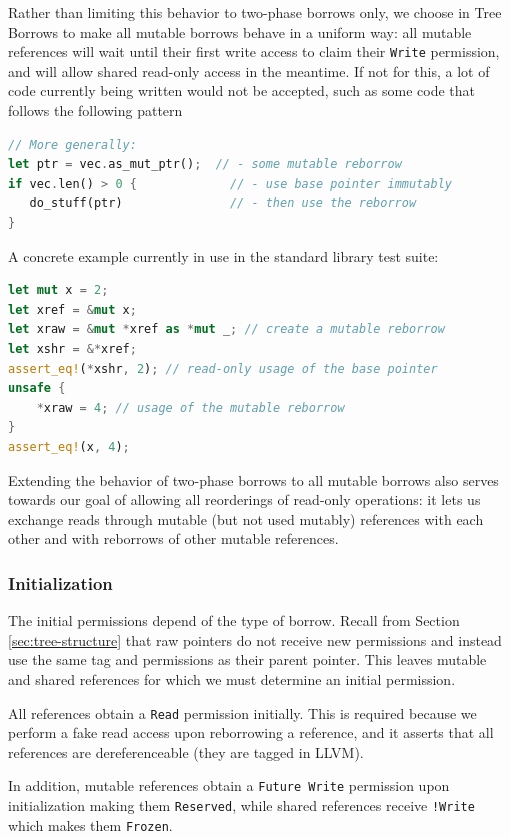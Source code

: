 \documentclass[a4paper,11pt]{article}
\theoremstyle{plain}
\theoremstyle{definition}
\theoremstyle{remark}
\newcommand{\tcode}[1]{\rstinline{#1}}
\newcommand{\tperm}[1]{\texttt{#1}}
\begin{document}
Rather than limiting this behavior to two-phase borrows only, we choose in Tree
Borrows to make all mutable borrows behave in a uniform way: all mutable references
will wait until their first write access to claim their \tperm{Write} permission,
and will allow shared read-only access in the meantime. If not for this, a lot
of code currently being written would not be accepted, such as some code that
follows the following pattern
\begin{lstlisting}[language=rust]
                               // More generally:
let ptr = vec.as_mut_ptr();  // - some mutable reborrow
if vec.len() > 0 {             // - use base pointer immutably
   do_stuff(ptr)               // - then use the reborrow
}
\end{lstlisting}

A concrete example currently in use in the standard library test suite:
\begin{lstlisting}[language=rust]
let mut x = 2;
let xref = &mut x;
let xraw = &mut *xref as *mut _; // create a mutable reborrow
let xshr = &*xref;
assert_eq!(*xshr, 2); // read-only usage of the base pointer
unsafe {
    *xraw = 4; // usage of the mutable reborrow
}
assert_eq!(x, 4);
\end{lstlisting}

Extending the behavior of two-phase borrows to all mutable borrows also serves
towards our goal of allowing all reorderings of read-only operations: it lets
us exchange reads through mutable (but not used mutably) references with each
other and with reborrows of other mutable references.

\subsubsection{Initialization}

The initial permissions depend of the type of borrow.
Recall from Section \ref{sec:tree-structure} that raw pointers do not receive new permissions and instead
use the same tag and permissions as their parent pointer. This leaves mutable and
shared references for which we must determine an initial permission.

All references obtain a \tperm{Read} permission initially. This is required
because we perform a fake read access upon reborrowing a reference, and it asserts
that all references are dereferenceable (they are tagged \tcode{dereferenceable}
in LLVM).

In addition, mutable references obtain a \tperm{Future Write} permission upon initialization
making them \tperm{Reserved}, while shared references receive \tperm{!Write} which makes them \tperm{Frozen}.
\end{document}
